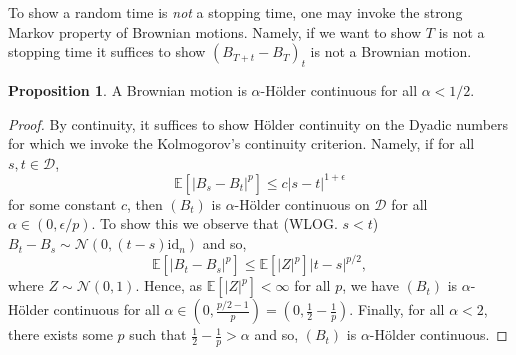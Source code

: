 \documentclass[]{article}
\theoremstyle{definition}
\newtheorem*{proposition}{Proposition}
\begin{document}
To show a random time is \textit{not} a stopping time, one may invoke the strong Markov property of 
Brownian motions. Namely, if we want to show \(T\) is not a stopping time it suffices to show 
\((B_{T + t} - B_T)_t\) is not a Brownian motion.

\begin{proposition}
  A Brownian motion is \(\alpha\)-Hölder continuous for all \(\alpha < 1 / 2\).
\end{proposition}
\begin{proof}
  By continuity, it suffices to show Hölder continuity on the Dyadic numbers for which we invoke the 
  Kolmogorov's continuity criterion. Namely, if for all \(s, t \in \mathcal{D}\),
  \[\mathbb{E}[|B_s - B_t|^p] \le c|s - t|^{1 + \epsilon}\]
  for some constant \(c\), then \((B_t)\) is \(\alpha\)-Hölder continuous on \(\mathcal{D}\) for all 
  \(\alpha \in (0, \epsilon / p)\). To show this we observe that (WLOG. \(s < t\)) 
  \(B_t - B_s \sim \mathcal{N}(0, (t - s)\text{id}_n)\) and so, 
  \[\mathbb{E}[|B_t - B_s|^p] \le \mathbb{E}[|Z|^p] |t - s|^{p / 2},\]
  where \(Z \sim \mathcal{N}(0, 1)\). Hence, as \(\mathbb{E}[|Z|^p] < \infty\) for all \(p\), we have 
  \((B_t)\) is \(\alpha\)-Hölder continuous for all \(\alpha \in \left(0, \frac{p / 2 - 1}{p}\right)
  = \left(0, \frac{1}{2} - \frac{1}{p}\right)\). Finally, for all \(\alpha < 2\), there exists some 
  \(p\) such that \(\frac{1}{2}-\frac{1}{p} > \alpha\) and so, \((B_t)\) is \(\alpha\)-Hölder continuous.
\end{proof}
\end{document}
